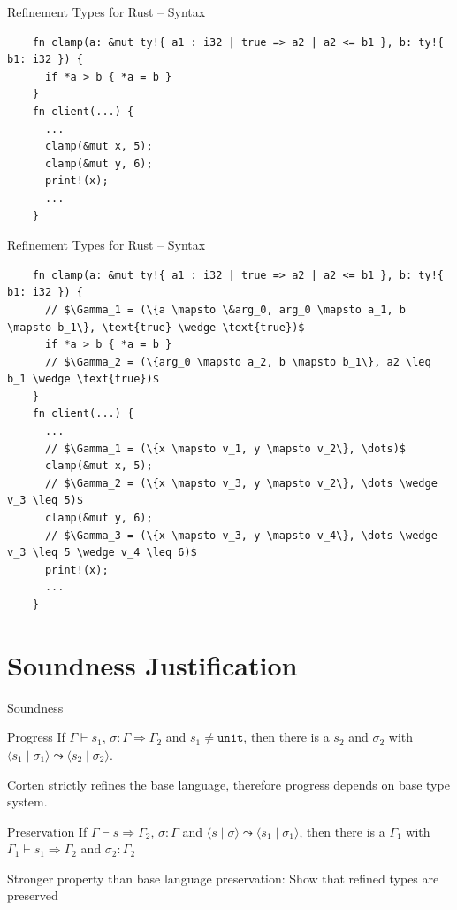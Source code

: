 \documentclass{sdqbeamer}
\newcommand{\code}[1]{\texttt{#1}}
\newcommand{\tuple}[2]{\langle #1 \mid #2 \rangle}
\begin{document}
\begin{frame}[fragile]{Refinement Types for Rust -- Syntax}
  \begin{verbatim}
    fn clamp(a: &mut ty!{ a1 : i32 | true => a2 | a2 <= b1 }, b: ty!{ b1: i32 }) { 
      if *a > b { *a = b }
    }
    fn client(...) {
      ...
      clamp(&mut x, 5);
      clamp(&mut y, 6);
      print!(x);
      ...
    }
  \end{verbatim}
\end{frame}

\begin{frame}[fragile]{Refinement Types for Rust -- Syntax}
  \begin{verbatim}
    fn clamp(a: &mut ty!{ a1 : i32 | true => a2 | a2 <= b1 }, b: ty!{ b1: i32 }) { 
      // $\Gamma_1 = (\{a \mapsto \&arg_0, arg_0 \mapsto a_1, b \mapsto b_1\}, \text{true} \wedge \text{true})$
      if *a > b { *a = b }
      // $\Gamma_2 = (\{arg_0 \mapsto a_2, b \mapsto b_1\}, a2 \leq b_1 \wedge \text{true})$
    }
    fn client(...) {
      ...
      // $\Gamma_1 = (\{x \mapsto v_1, y \mapsto v_2\}, \dots)$
      clamp(&mut x, 5);
      // $\Gamma_2 = (\{x \mapsto v_3, y \mapsto v_2\}, \dots \wedge v_3 \leq 5)$
      clamp(&mut y, 6);
      // $\Gamma_3 = (\{x \mapsto v_3, y \mapsto v_4\}, \dots \wedge v_3 \leq 5 \wedge v_4 \leq 6)$
      print!(x);
      ...
    }
  \end{verbatim}
\end{frame}

\section{Soundness Justification}

\begin{frame}[fragile]{Soundness}
  \begin{greenblock}{Progress}
    If $\Gamma \vdash s_1$, $\sigma : \Gamma \Rightarrow \Gamma_2$ and $s_1 \neq \code{unit}$, then there is a $s_2$ and $\sigma_2$ with $\tuple{s_1}{\sigma_1} \leadsto \tuple{s_2}{\sigma_2}$.
  \end{greenblock}

  Corten strictly refines the base language, therefore progress depends on base type system.

  \begin{greenblock}{Preservation}
    If $\Gamma \vdash s \Rightarrow \Gamma_2$, $\sigma : \Gamma$ and $\tuple{s}{\sigma} \leadsto \tuple{s_1}{\sigma_1}$, then there is a $\Gamma_1$ with $\Gamma_1 \vdash s_1 \Rightarrow \Gamma_2$ and $\sigma_2 : \Gamma_2$
  \end{greenblock}

  Stronger property than base language preservation: Show that refined types are preserved
\end{frame}
\end{document}
